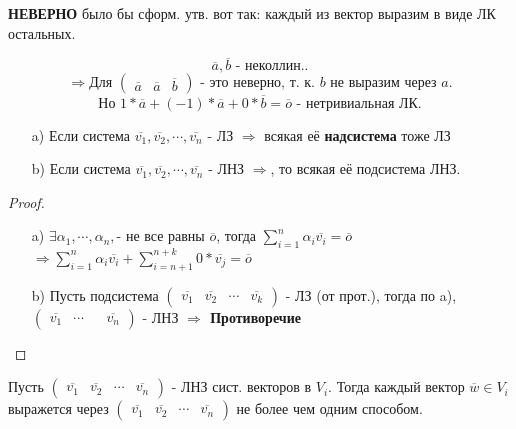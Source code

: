 \begin{note}
\textbf{НЕВЕРНО }было бы сформ. утв. вот так: каждый из вектор выразим в виде ЛК остальных.
\begin{example}
\[
\overline{a}, \overline{b} \text{ - неколлин.}
.\] 
\[
    \Rightarrow \text{Для } \begin{pmatrix} \overline{a} & \overline{a} & \overline{b} \end{pmatrix} \text{ - это неверно, т. к. $b$ не выразим через $a$}
.\] 
\[
\text{Но } 1 * \overline{a} + (-1) * \overline{a} + 0 * \overline{b} = \overline{o} \text{ - нетривиальная ЛК}.
\] 
\end{example}

\end{note}
\begin{statement}
    \begin{itemize}
        \item [a) ] Если система $\overline{v_1}, \overline{v_2}, \cdots , \overline{v_n}$ - ЛЗ $\Rightarrow$ всякая её \textbf{надсистема} тоже ЛЗ
        \item[b) ] Если система $\overline{v_1}, \overline{v_2}, \cdots, \overline{v_n}$ - ЛНЗ $\Rightarrow$, то всякая её подсистема ЛНЗ. 
    \end{itemize}
\end{statement}
\begin{proof}
\begin{itemize}
    \item [a) ] $\exists \alpha_1, \cdots , \alpha_n, \text{- не все равны $\overline{o}$}$, тогда $\sum_{i = 1}^{n} \alpha_i \overline{v_i} = \overline{o}$
         $\Rightarrow \sum_{i = 1}^{n}  \alpha_i \overline{v_i} + \sum_{i = n + 1}^{n + k} 0 * \overline{v_j} = \overline{o}$
     \item [b) ] Пусть подсистема $\begin{pmatrix} \overline{v_1} & \overline{v_2} & \cdots & \overline{v_k} \end{pmatrix}$ - ЛЗ (от прот.), тогда по a), $\begin{pmatrix} \overline{v_1} & \cdots  && \overline{v_n} \end{pmatrix}$ - ЛНЗ \textbf{$ \Rightarrow $ Противоречие }
\end{itemize}
\end{proof}

\begin{statement}
    Пусть $\begin{pmatrix}\overline{v_1} & \overline{v_2} & \cdots & \overline{v_n} \end{pmatrix}$ - ЛНЗ сист. векторов в $V_i$. Тогда каждый вектор $\overline{w} \in  V_i$ выражется через $\begin{pmatrix}\overline{v_1} & \overline{v_2} & \cdots & \overline{v_n} \end{pmatrix}$ не более чем одним способом.
\end{statement}

